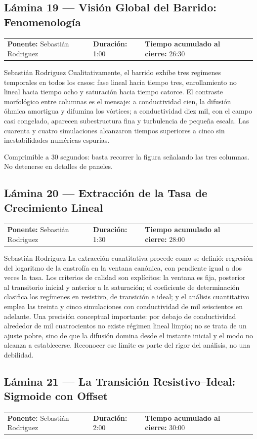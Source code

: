 \documentclass[11pt,letterpaper]{article}
\makeatletter
\newcommand{\lamina}[5]{%
  \subsection*{Lámina #1 --- #2}
  \noindent
  \begin{tabular}{@{}llll@{}}
    \textbf{Ponente:} #3 &\quad \textbf{Duración:} #4 &\quad
    \textbf{Tiempo acumulado al cierre:} #5 &
  \end{tabular}
  \vspace{2pt}}
\makeatother
\begin{document}
\lamina{19}{Visión Global del Barrido: Fenomenología}{Sebastián Rodriguez}{1:00}{26:30}

\begin{parlamento}{Sebastián Rodriguez}
Cualitativamente, el barrido exhibe tres regímenes temporales en todos los
casos: fase lineal hacia tiempo tres, enrollamiento no lineal hacia tiempo
ocho y saturación hacia tiempo catorce. El contraste morfológico entre
columnas es el mensaje: a conductividad cien, la difusión óhmica amortigua y
difumina los vórtices; a conductividad diez mil, con el campo casi
congelado, aparecen subestructura fina y turbulencia de pequeña escala. Las
cuarenta y cuatro simulaciones alcanzaron tiempos superiores a cinco sin
inestabilidades numéricas espurias.
\end{parlamento}

\begin{indicaciones}
Comprimible a 30 segundos: basta recorrer la figura señalando las tres
columnas. No detenerse en detalles de paneles.
\end{indicaciones}

\lamina{20}{Extracción de la Tasa de Crecimiento Lineal}{Sebastián Rodriguez}{1:30}{28:00}

\begin{parlamento}{Sebastián Rodriguez}
La extracción cuantitativa procede como se definió: regresión del logaritmo
de la enstrofía en la ventana canónica, con pendiente igual a dos veces la
tasa. Los criterios de calidad son explícitos: la ventana es fija,
posterior al transitorio inicial y anterior a la saturación; el coeficiente
de determinación clasifica los regímenes en resistivo, de transición e
ideal; y el análisis cuantitativo emplea las treinta y cinco simulaciones
con conductividad de mil seiscientos en adelante. Una precisión conceptual
importante: por debajo de conductividad alrededor de mil cuatrocientos no
existe régimen lineal limpio; no se trata de un ajuste pobre, sino de que
la difusión domina desde el instante inicial y el modo no alcanza a
establecerse. Reconocer ese límite es parte del rigor del análisis, no una
debilidad.
\end{parlamento}

\lamina{21}{La Transición Resistivo--Ideal: Sigmoide con Offset}{Sebastián Rodriguez}{2:00}{30:00}
\end{document}
